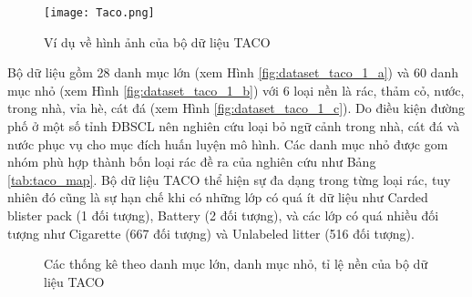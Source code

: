 \documentclass[../the.tex]{subfiles}
\begin{document}
\begin{figure}[H]
	\centering
	\texttt{[image: Taco.png]}
	\caption{Ví dụ về hình ảnh của bộ dữ liệu TACO \cite{proença2020taco}}
	\label{fig:dataset_taco}
\end{figure}
{\fontsize{13}{12} \selectfont

Bộ dữ liệu gồm 28 danh mục lớn  (xem Hình \ref{fig:dataset_taco_1_a}) và 60 danh mục nhỏ (xem Hình \ref{fig:dataset_taco_1_b}) với
6 loại nền là rác, thảm cỏ, nước, trong nhà, vỉa hè, cát đá (xem Hình \ref{fig:dataset_taco_1_c}). Do
điều kiện đường phố ở một số tỉnh ĐBSCL nên nghiên cứu loại bỏ ngữ cảnh trong nhà, cát đá và nước phục vụ cho mục đích huấn luyện mô hình. Các danh
mục nhỏ được gom nhóm phù hợp thành bốn loại rác đề ra của nghiên cứu như Bảng \ref{tab:taco_map}. Bộ dữ liệu TACO thể hiện sự đa dạng trong từng loại rác,
tuy nhiên đó cũng là sự hạn chế khi có những lớp có quá ít dữ liệu như Carded blister pack (1 đối tượng), Battery (2 đối tượng), và các lớp có quá nhiều đối tượng như Cigarette (667 đối tượng) và Unlabeled litter (516 đối tượng).

}

\begin{figure}[H]
	\centering
	\qquad
	\qquad
	\caption{Các thống kê theo danh mục lớn, danh mục nhỏ, tỉ lệ nền của bộ dữ liệu TACO}%
	\label{fig:dataset_taco_1}
\end{figure}
\end{document}
